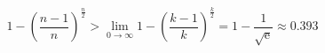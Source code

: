 \begin{equation}
\label{eqn:bootstrap}
1 - \left(\frac{n-1}{n}\right)^{\frac{n}{2}} > \lim_{0 \to \infty} 1 - \left(\frac{k-1}{k}\right)^{\frac{k}{2}} = 1 - \frac{1}{\sqrt{{\mathrm{e}}}} \approx 0.393
\end{equation}
